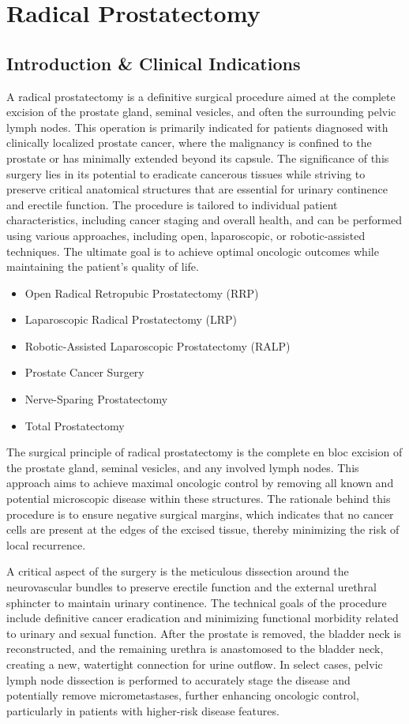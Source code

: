 \chapter{Radical Prostatectomy}

\section*{Introduction \& Clinical Indications}
A radical prostatectomy is a definitive surgical procedure aimed at the complete excision of the prostate gland, seminal vesicles, and often the surrounding pelvic lymph nodes. This operation is primarily indicated for patients diagnosed with clinically localized prostate cancer, where the malignancy is confined to the prostate or has minimally extended beyond its capsule. The significance of this surgery lies in its potential to eradicate cancerous tissues while striving to preserve critical anatomical structures that are essential for urinary continence and erectile function. The procedure is tailored to individual patient characteristics, including cancer staging and overall health, and can be performed using various approaches, including open, laparoscopic, or robotic-assisted techniques. The ultimate goal is to achieve optimal oncologic outcomes while maintaining the patient's quality of life.

\begin{itemize}
  \item Open Radical Retropubic Prostatectomy (RRP)
  \item Laparoscopic Radical Prostatectomy (LRP)
  \item Robotic-Assisted Laparoscopic Prostatectomy (RALP)
  \item Prostate Cancer Surgery
  \item Nerve-Sparing Prostatectomy
  \item Total Prostatectomy
\end{itemize}

The surgical principle of radical prostatectomy is the complete en bloc excision of the prostate gland, seminal vesicles, and any involved lymph nodes. This approach aims to achieve maximal oncologic control by removing all known and potential microscopic disease within these structures. The rationale behind this procedure is to ensure negative surgical margins, which indicates that no cancer cells are present at the edges of the excised tissue, thereby minimizing the risk of local recurrence.

A critical aspect of the surgery is the meticulous dissection around the neurovascular bundles to preserve erectile function and the external urethral sphincter to maintain urinary continence. The technical goals of the procedure include definitive cancer eradication and minimizing functional morbidity related to urinary and sexual function. After the prostate is removed, the bladder neck is reconstructed, and the remaining urethra is anastomosed to the bladder neck, creating a new, watertight connection for urine outflow. In select cases, pelvic lymph node dissection is performed to accurately stage the disease and potentially remove micrometastases, further enhancing oncologic control, particularly in patients with higher-risk disease features.

